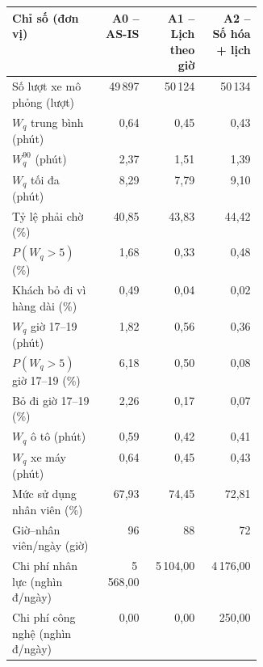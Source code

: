 \begin{tabular}{p{0.36\linewidth}rrr}
\toprule
\textbf{Chỉ số (đơn vị)} & \textbf{A0 -- AS-IS} & \textbf{A1 -- Lịch theo giờ} & \textbf{A2 -- Số hóa + lịch} \\
\midrule
Số lượt xe mô phỏng (lượt) & 49\,897 & 50\,124 & 50\,134 \\
$W_q$ trung bình (phút) & 0{,}64 & 0{,}45 & 0{,}43 \\
$W_q^{90}$ (phút) & 2{,}37 & 1{,}51 & 1{,}39 \\
$W_q$ tối đa (phút) & 8{,}29 & 7{,}79 & 9{,}10 \\
Tỷ lệ phải chờ (\%) & 40{,}85 & 43{,}83 & 44{,}42 \\
$P(W_q>5)$ (\%) & 1{,}68 & 0{,}33 & 0{,}48 \\
Khách bỏ đi vì hàng dài (\%) & 0{,}49 & 0{,}04 & 0{,}02 \\
$W_q$ giờ 17--19 (phút) & 1{,}82 & 0{,}56 & 0{,}36 \\
$P(W_q>5)$ giờ 17--19 (\%) & 6{,}18 & 0{,}50 & 0{,}08 \\
Bỏ đi giờ 17--19 (\%) & 2{,}26 & 0{,}17 & 0{,}07 \\
$W_q$ ô tô (phút) & 0{,}59 & 0{,}42 & 0{,}41 \\
$W_q$ xe máy (phút) & 0{,}64 & 0{,}45 & 0{,}43 \\
Mức sử dụng nhân viên (\%) & 67{,}93 & 74{,}45 & 72{,}81 \\
Giờ--nhân viên/ngày (giờ) & 96 & 88 & 72 \\
Chi phí nhân lực (nghìn đ/ngày) & 5\,568{,}00 & 5\,104{,}00 & 4\,176{,}00 \\
Chi phí công nghệ (nghìn đ/ngày) & 0{,}00 & 0{,}00 & 250{,}00 \\
\bottomrule
\end{tabular}
